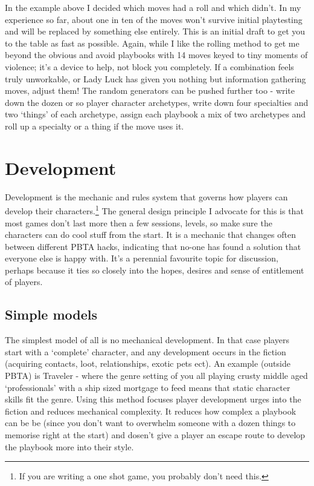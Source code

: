 \documentclass{tufte-handout}
\begin{document}
In the example above I decided which moves had a roll and which didn't. In my experience so far, about one in  ten of the moves won't survive initial playtesting and will be replaced by something else entirely. This is an initial draft to get you to the table as fast as possible. Again, while I like the rolling method to get me beyond the obvious and avoid playbooks with 14 moves keyed to tiny moments of violence; it's a device to help, not block you completely. If a combination feels truly unworkable, or Lady Luck has given you nothing but information gathering moves, adjust them! The random generators can be pushed further too - write down the dozen or so player character archetypes, write down four specialties and two `things' of each archetype, assign each playbook a mix of two archetypes and roll up a specialty or a thing if the move uses it. 

\section{ Development}
Development is the mechanic and rules system that governs how players can develop their characters.\footnote{If you are writing a one shot game, you probably don't need this. } The general design principle I advocate for this is that most games don't last more then a few sessions, levels, so make sure the characters can do cool stuff from the start. 
It is a mechanic that changes often between different PBTA hacks, indicating that no-one has found a solution that everyone else is happy with. It's a perennial favourite topic for discussion, perhaps because it  ties so closely into the hopes, desires and sense of entitlement of players. 

\subsection{Simple models}
The simplest model of all is no mechanical development. In that case players start with a `complete' character, and any development occurs in the fiction (acquiring contacts, loot, relationships, exotic pets ect). An example (outside PBTA) is Traveler - where the genre setting of you all playing crusty middle aged `professionals' with a ship sized mortgage to feed means that static character skills fit the genre. Using this method  focuses player development urges into the fiction and reduces mechanical complexity. It reduces how complex a playbook can be be (since you don't want to overwhelm someone with a dozen things to memorise right at the start) and dosen't give a player an escape route to develop the playbook more into their style. 
\end{document}
